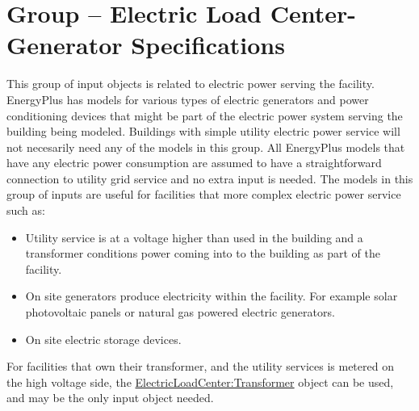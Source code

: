 \section{Group -- Electric Load Center-Generator Specifications}\label{group-electric-load-center-generator-specifications}

This group of input objects is related to electric power serving the facility. EnergyPlus has models for various types of electric generators and power conditioning devices that might be part of the electric power system serving the building being modeled. Buildings with simple utility electric power service will not necesarily need any of the models in this group. All EnergyPlus models that have any electric power consumption are assumed to have a straightforward connection to utility grid service and no extra input is needed. The models in this group of inputs are useful for facilities that more complex electric power service such as:

\begin{itemize}
\tightlist
\item
  Utility service is at a voltage higher than used in the building and a transformer conditions power coming into to the building as part of the facility.
\item
  On site generators produce electricity within the facility. For example solar photovoltaic panels or natural gas powered electric generators.
\item
  On site electric storage devices.
\end{itemize}

For facilities that own their transformer, and the utility services is metered on the high voltage side, the \hyperref[electricloadcentertransformer]{ElectricLoadCenter:Transformer} object can be used, and may be the only input object needed.

